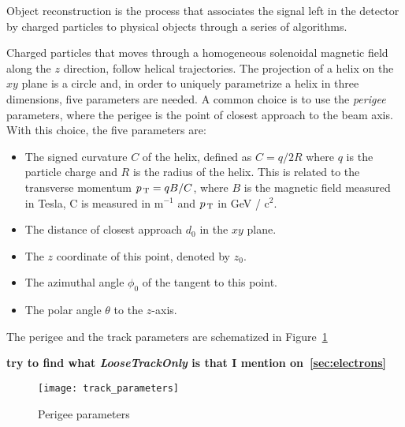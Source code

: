 Object reconstruction is the process that associates the signal left in the
detector by charged particles to physical objects through a series of
algorithms.

Charged particles that moves through a homogeneous solenoidal magnetic field
along the $z$ direction, follow helical trajectories. The projection of a helix
on the $xy$ plane is a circle and, in order to uniquely parametrize a helix in
three dimensions, five parameters are needed. A common choice is to use the
\emph{perigee} parameters, where the perigee is the point of closest approach to
the beam axis. With this choice, the five parameters are:
\begin{itemize}
\item The signed curvature $C$ of the helix, defined as $C = q / 2R$ where $q$ is
  the particle charge and $R$ is the radius of the helix. This is related to the
  transverse momentum $p_\mathrm{\, T} = qB / C$, where $B$ is the magnetic field measured
  in Tesla, C is measured in m$^{-1}$ and $p_\mathrm{\, T}$ in GeV / c$^2$.
\item The distance of closest approach $d_0$ in the $xy$ plane.
\item The $z$ coordinate of this point, denoted by $z_0$.
\item The azimuthal angle $\phi_0$ of the tangent to this point.
\item The polar angle $\theta$ to the $z$-axis.
\end{itemize}
The perigee and the track parameters are schematized in Figure~\ref{fig:track_par}

\mbox{}

\textbf{try to find what \emph{LooseTrackOnly} is that I mention
  on~\autoref{sec:electrons}}
\begin{figure}[!h]
  \centering
    \texttt{[image: track\_parameters]}
    \caption{Perigee parameters}
    \label{fig:track_par}
\end{figure}

